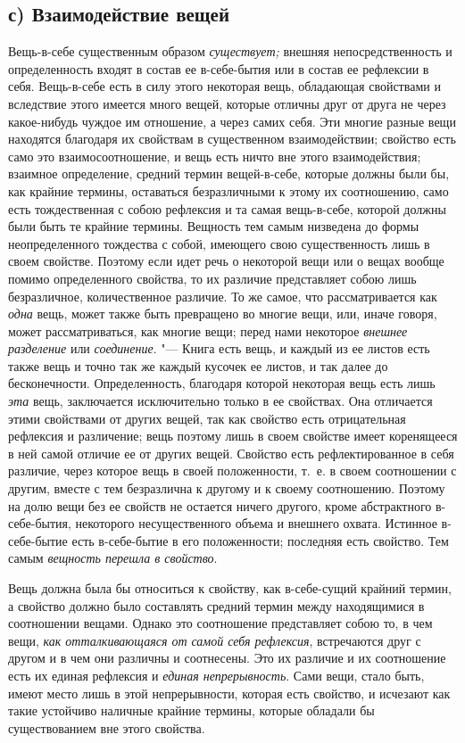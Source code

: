 \subsection[с) Взаимодействие вещей]{с) Взаимодействие вещей}
Вещь-в-себе существенным образом
{\em существует;} внешняя непосредственность и
определенность входят в состав ее в-себе-бытия или в состав ее рефлексии в
себя. Вещь-в-себе есть в силу этого некоторая вещь, обладающая свойствами и
вследствие этого имеется много вещей, которые отличны друг от друга не
через какое-нибудь чуждое им отношение, а через самих себя. Эти многие
разные вещи находятся благодаря их свойствам в существенном взаимодействии;
свойство есть само это взаимосоотношение, и вещь есть ничто вне этого
взаимодействия; взаимное определение, средний термин вещей-в-себе, которые
должны были бы, как крайние термины, оставаться безразличными к этому их
соотношению, само есть тождественная с собою рефлексия и та самая
вещь-в-себе, которой должны были быть те крайние термины. Вещность тем
самым низведена до формы неопределенного тождества с собой, имеющего свою
существенность лишь в своем свойстве. Поэтому если идет речь о некоторой
вещи или о вещах вообще помимо определенного свойства, то их различие
представляет собою лишь безразличное, количественное различие. То же самое,
что рассматривается как {\em одна} вещь, может также
быть превращено во многие вещи, или, иначе говоря, может рассматриваться,
как многие вещи; перед нами некоторое {\em внешнее
разделение} или {\em соединение}. "--- Книга есть вещь, и
каждый из ее листов есть также вещь и точно так же каждый кусочек ее
листов, и так далее до бесконечности. Определенность, благодаря которой
некоторая вещь есть лишь {\em эта} вещь, заключается
исключительно только в ее свойствах. Она отличается этими свойствами от
других вещей, так как свойство есть отрицательная рефлексия и различение;
вещь поэтому лишь в своем свойстве имеет коренящееся в ней самой отличие ее
от других вещей. Свойство есть рефлектированное в себя различие, через
которое вещь в своей положенности, т.~е. в своем соотношении с другим,
вместе с тем безразлична к другому и к своему соотношению. Поэтому на долю
вещи без ее свойств не остается ничего другого, кроме абстрактного
в-себе-бытия, некоторого несущественного объема и внешнего охвата. Истинное
в-себе-бытие есть в-себе-бытие в его положенности; последняя есть свойство.
Тем самым {\em вещность перешла в свойство}.

Вещь должна была бы относиться к свойству, как в-себе-сущий крайний термин,
а свойство должно было составлять средний термин между находящимися в
соотношении вещами. Однако это соотношение представляет собою то, в чем
вещи, {\em как отталкивающаяся от самой себя
рефлексия}, встречаются друг с другом и в чем они различны и соотнесены.
Это их различие и их соотношение есть их единая рефлексия и
{\em единая непрерывность}. Сами вещи, стало быть,
имеют место лишь в этой непрерывности, которая есть свойство, и исчезают
как такие устойчиво наличные крайние термины, которые обладали бы
существованием вне этого свойства.

